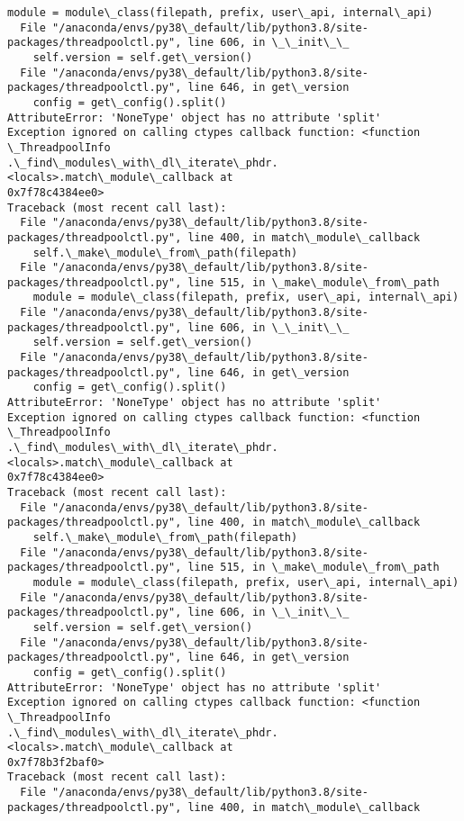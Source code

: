 \documentclass[11pt]{article}
\begin{document}
\begin{Verbatim}[commandchars=\\\{\}]
    module = module\_class(filepath, prefix, user\_api, internal\_api)
  File "/anaconda/envs/py38\_default/lib/python3.8/site-
packages/threadpoolctl.py", line 606, in \_\_init\_\_
    self.version = self.get\_version()
  File "/anaconda/envs/py38\_default/lib/python3.8/site-
packages/threadpoolctl.py", line 646, in get\_version
    config = get\_config().split()
AttributeError: 'NoneType' object has no attribute 'split'
Exception ignored on calling ctypes callback function: <function \_ThreadpoolInfo
.\_find\_modules\_with\_dl\_iterate\_phdr.<locals>.match\_module\_callback at
0x7f78c4384ee0>
Traceback (most recent call last):
  File "/anaconda/envs/py38\_default/lib/python3.8/site-
packages/threadpoolctl.py", line 400, in match\_module\_callback
    self.\_make\_module\_from\_path(filepath)
  File "/anaconda/envs/py38\_default/lib/python3.8/site-
packages/threadpoolctl.py", line 515, in \_make\_module\_from\_path
    module = module\_class(filepath, prefix, user\_api, internal\_api)
  File "/anaconda/envs/py38\_default/lib/python3.8/site-
packages/threadpoolctl.py", line 606, in \_\_init\_\_
    self.version = self.get\_version()
  File "/anaconda/envs/py38\_default/lib/python3.8/site-
packages/threadpoolctl.py", line 646, in get\_version
    config = get\_config().split()
AttributeError: 'NoneType' object has no attribute 'split'
Exception ignored on calling ctypes callback function: <function \_ThreadpoolInfo
.\_find\_modules\_with\_dl\_iterate\_phdr.<locals>.match\_module\_callback at
0x7f78c4384ee0>
Traceback (most recent call last):
  File "/anaconda/envs/py38\_default/lib/python3.8/site-
packages/threadpoolctl.py", line 400, in match\_module\_callback
    self.\_make\_module\_from\_path(filepath)
  File "/anaconda/envs/py38\_default/lib/python3.8/site-
packages/threadpoolctl.py", line 515, in \_make\_module\_from\_path
    module = module\_class(filepath, prefix, user\_api, internal\_api)
  File "/anaconda/envs/py38\_default/lib/python3.8/site-
packages/threadpoolctl.py", line 606, in \_\_init\_\_
    self.version = self.get\_version()
  File "/anaconda/envs/py38\_default/lib/python3.8/site-
packages/threadpoolctl.py", line 646, in get\_version
    config = get\_config().split()
AttributeError: 'NoneType' object has no attribute 'split'
Exception ignored on calling ctypes callback function: <function \_ThreadpoolInfo
.\_find\_modules\_with\_dl\_iterate\_phdr.<locals>.match\_module\_callback at
0x7f78b3f2baf0>
Traceback (most recent call last):
  File "/anaconda/envs/py38\_default/lib/python3.8/site-
packages/threadpoolctl.py", line 400, in match\_module\_callback

\end{Verbatim}
\end{document}
